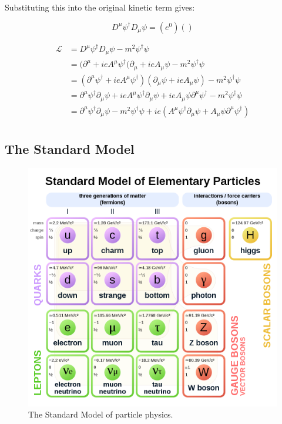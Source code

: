 \documentclass[12pt,a4paper,epsf,portrait,times,epsfig]{article}
\begin{document}
	Substituting this into the original kinetic term gives:

	\begin{equation}
		D^{\mu}\psi^{\dagger}D_{\mu}\psi = (e^{0})()
	\end{equation}

	\begin{equation}
		\begin{split}
		\mathcal{L} &= D^{\mu} \psi^{\dagger} D_{\mu} \psi - m^{2} \psi^{\dagger} \psi \\
		&= (\partial^{\mu}+ieA^{\mu}\psi^{\dagger} (\partial_{\mu}+ieA_{\mu}\psi - m^{2} \psi^{\dagger}\psi \\
		&= (\partial^{\mu}\psi^{\dagger}+ieA^{\mu}\psi^{\dagger})(\partial_{\mu}\psi+ieA_{\mu}\psi)-m^{2}\psi^{\dagger}\psi \\
		&= \partial^{\mu}\psi^{\dagger}\partial_{\mu}\psi + ieA^{\mu}\psi^{\dagger}\partial_{\mu}\psi + ieA_{\mu}\psi\partial^{\mu}\psi^{\dagger} - m^{2}\psi^{\dagger}\psi \\
		&= \partial^{\mu} \psi^{\dagger} \partial_{\mu} \psi - m^{2}\psi^{\dagger}\psi + ie(A^{\mu}\psi^{\dagger}\partial_{\mu}\psi+A_{\mu}\psi\partial^{\mu}\psi^{\dagger}) \\
		\end{split}
	\end{equation}


	\subsection{The Standard Model}

	\begin{figure}[h!]
		\centering
		\includegraphics[scale=0.3]{Standard_Model.png}
		\caption{The Standard Model of particle physics.}
		\label{Fig:StandardModel} 
	\end{figure}
\end{document}

